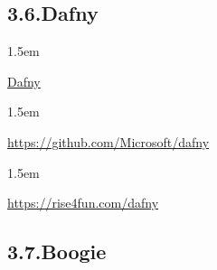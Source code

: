 \documentclass[12pt,twoside]{article}
\begin{document}
\subsection{3.6.\hspace*{0.5em}Dafny}\label{sec-dafny}%

\begin{mddefinitions}%


\begin{mdbmarginx}{}{}{}{1.5em}%
\begin{mddefdata}%
\href{https://www.microsoft.com/en-us/research/project/dafny-a-language-and-program-verifier-for-functional-correctness}{Dafny}
\end{mddefdata}%
\end{mdbmarginx}%


\begin{mdbmarginx}{}{}{}{1.5em}%
\begin{mddefdata}%
\href{https://github.com/Microsoft/dafny}{{\ttfamily https://\hspace{0pt}github.\hspace{0pt}com/\hspace{0pt}Microsoft/\hspace{0pt}dafny}}
\end{mddefdata}%
\end{mdbmarginx}%


\begin{mdbmarginx}{}{}{}{1.5em}%
\begin{mddefdata}%
\href{https://rise4fun.com/dafny}{{\ttfamily https://\hspace{0pt}rise4fun.\hspace{0pt}com/\hspace{0pt}dafny}}%
\end{mddefdata}%
\end{mdbmarginx}%
\end{mddefinitions}%

\subsection{3.7.\hspace*{0.5em}Boogie}\label{sec-boogie}%
\end{document}
